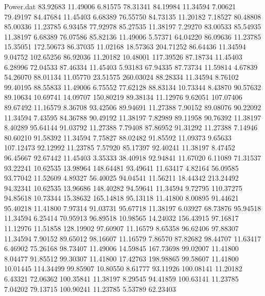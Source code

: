 \begin{filecontents}{Power.dat}
  83.92683   11.49006    6.81575   78.31341
  84.19984   11.34594    7.00621   79.49197
  84.47684   11.45403    6.68389   76.55750
  84.73135   11.20182    7.18527   80.48808
  85.00336   11.23785    6.93458   77.92978
  85.27535   11.38197    7.29270   83.00533
  85.54935   11.38197    6.68389   76.07586
  85.82136   11.49006    5.57371   64.04220
  86.09636   11.23785   15.35051  172.50673
  86.37035   11.02168   18.57363  204.71252
  86.64436   11.34594    9.04752  102.65256
  86.92036   11.20182   10.48001  117.39526
  87.18734   11.45403    6.28996   72.04533
  87.46334   11.45403    5.93183   67.94335
  87.73734   11.59814    4.67839   54.26070
  88.01134   11.05770   23.51575  260.03024
  88.28334   11.34594    8.76102   99.40195
  88.55833   11.49006    6.75552   77.62128
  88.83134   10.73344    8.43870   90.57632
  89.10634   10.69741   14.09707  150.80219
  89.38134   11.12976    9.62051  107.07406
  89.67492   11.16579    8.36708   93.42506
  89.94691   11.27388    7.90152   89.08076
  90.22092   11.34594    7.43595   84.36788
  90.49192   11.38197    7.82989   89.11958
  90.76392   11.38197    8.40289   95.64144
  91.03792   11.27388    7.79408   87.86952
  91.31292   11.27388    7.14946   80.60210
  91.58392   11.34594    7.75827   88.02482
  91.85592   11.09373    9.65633  107.12473
  92.12992   11.23785    7.57920   85.17397
  92.40241   11.38197    8.47452   96.45667
  92.67442   11.45403    3.35333   38.40918
  92.94841   11.67020    6.11089   71.31537
  93.22241   10.62535   13.98964  148.64481
  93.49641   11.63417    4.82164   56.09585
  93.77042   11.52609    4.89327   56.40025
  94.04541   11.56211   18.44342  213.24492
  94.32341   10.62535   13.96686  148.40282
  94.59641   11.34594    9.72795  110.37275
  94.85618   10.73344   15.38632  165.14818
  95.13118   11.41800    8.00895   91.44621
  95.40218   11.41800    7.97314   91.03731
  95.67718   11.38197    6.03927   68.73876
  95.94518   11.34594    6.25414   70.95913
  96.89518   10.98565   14.24032  156.43915
  97.16817   11.12976   11.51858  128.19902
  97.60907   11.16579    8.65358   96.62406
  97.88307   11.34594    7.90152   89.65012
  98.16607   11.16579    7.86570   87.82682
  98.44707   11.63417    6.46902   75.26168
  98.73407   11.49006   14.59845  167.73698
  99.02007   11.41800    8.04477   91.85512
  99.30307   11.41800   17.42763  198.98865
  99.58607   11.41800   10.01445  114.34499
  99.85907   10.80550    8.61777   93.11926
 100.08141   11.20182    6.43321   72.06362
 100.35841   11.38197    8.29545   94.41859
 100.63141   11.23785    7.04202   79.13715
 100.90241   11.23785    5.53789   62.23403

\end{filecontents}
